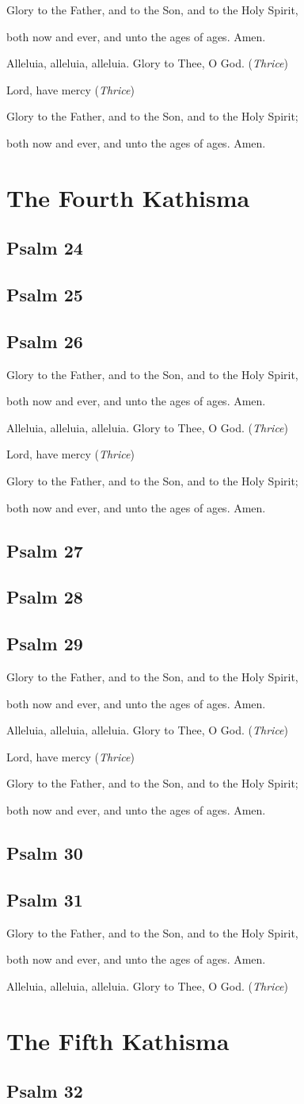 \documentclass[12pt,openany]{book}
\newcommand{\kathismabreak}{
  \medskip
  \begin{center}
  \begin{footnotesize}
  Glory to the Father, and to the Son, and to the Holy Spirit,
  
  both now and ever, and unto the ages of ages. Amen.

  Alleluia, alleluia, alleluia. Glory to Thee, O God. (\textit{Thrice})

  Lord, have mercy (\textit{Thrice})

  Glory to the Father, and to the Son, and to the Holy Spirit;
  
  both now and ever, and unto the ages of ages. Amen.
  \end{footnotesize}
  \end{center}
  \smallbreak
}
\newcommand{\kathismaend}{
  \medskip
  \begin{center}
  \begin{footnotesize}
  Glory to the Father, and to the Son, and to the Holy Spirit,
  
  both now and ever, and unto the ages of ages. Amen.

  Alleluia, alleluia, alleluia. Glory to Thee, O God. (\textit{Thrice})
  \end{footnotesize}
  \end{center}
  \smallbreak
}
\begin{document}
\kathismabreak

\chapter*{The Fourth Kathisma}
\smallskip
\section{Psalm 24}

\smallskip
\section{Psalm 25}

\smallskip
\section{Psalm 26}


\kathismabreak
\smallskip

\section{Psalm 27}

\medskip
\section{Psalm 28}

\medskip
\section{Psalm 29}

\smallbreak

\pagebreak %
\kathismabreak
\smallskip

\section{Psalm 30}

\smallskip
\section{Psalm 31}


\kathismaend

\chapter*{The Fifth Kathisma}
\smallskip
\section{Psalm 32}

\smallskip
\end{document}
